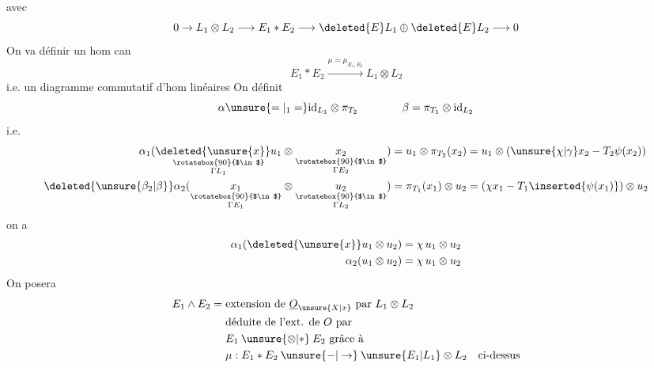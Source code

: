 avec
\[
0\to L_1\otimes L_2\longrightarrow E_1*E_2\longrightarrow\deleted{E}L_1\oplus\deleted{E}L_2\longrightarrow0
\]
On va définir un hom can
\[
E_1*E_2\xrightarrow{\mu=\mu_{E_1,E_2}}L_1\otimes L_2
\]
i.e. un diagramme commutatif d'hom linéaires
On définit
\[
\alpha\unsure{=|_1=}\mathrm{id}_{L_1}\otimes\pi_{T_2}\qquad\qquad\beta=\pi_{T_1}\otimes\mathrm{id}_{L_2}
\]
i.e.
\[
\begin{aligned}
\alpha_1(\underset{\substack{\rotatebox{90}{$\in$}\\\Gamma L_1}}{\deleted{\unsure{x}}u_1}\otimes
\underset{\substack{\rotatebox{90}{$\in$}\\\Gamma E_2}}{x_2})
&=u_1\otimes\pi_{T_2}(x_2)=u_1\otimes(\unsure{\chi|\gamma}x_2-T_2\psi(x_2))\\
\deleted{\unsure{\beta_2|\beta}}\alpha_2(\underset{\substack{\rotatebox{90}{$\in$}\\\Gamma E_1}}{x_1}\otimes
\underset{\substack{\rotatebox{90}{$\in$}\\\Gamma L_2}}{u_2})
&=\pi_{T_1}(x_1)\otimes u_2=(\chi x_1-T_1\inserted{\psi(x_1)})\otimes u_2
\end{aligned}
\]
on a
\[
\begin{aligned}
\alpha_1(\deleted{\unsure{x}}u_1\otimes u_2)&=\chi\,u_1\otimes u_2\\
\alpha_2(u_1\otimes u_2)&=\chi\,u_1\otimes u_2
\end{aligned}
\]
On posera
\[
\begin{aligned}
E_1\wedge E_2={}&\text{extension de }\underline O_{\unsure{X|x}}\text{ par }L_1\otimes L_2\\
&\text{déduite de l'ext. de }O\text{ par}\\
&E_1\mathbin{\unsure{\otimes|*}}E_2\text{ grâce à}\\
&\mu:E_1*E_2\mathbin{\unsure{-|\to}}\unsure{E_1|L_1}\otimes L_2\quad\text{ci-dessus}
\end{aligned}
\]
